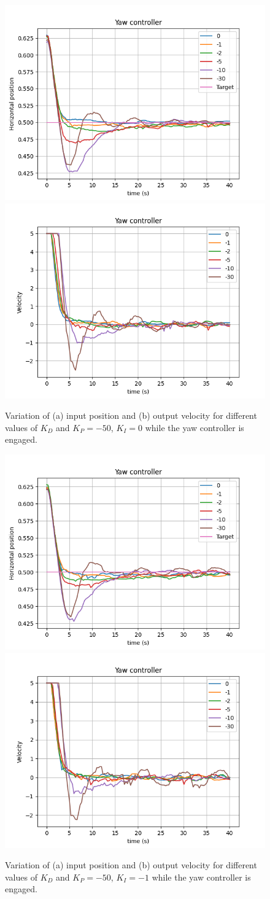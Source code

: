 \begin{figure}
  \centering
  \includegraphics[width=.45\linewidth]{img/pid/yaw/yaw_pos_p50_i0_der.png}
  \includegraphics[width=.45\linewidth]{img/pid/yaw/yaw_vel_p50_i0_der.png}
  \caption{Variation of (a) input position and (b) output velocity for different values of $K_{D}$ and $K_P=-50$, $K_I=0$ while the yaw controller is engaged.}\label{fig:tune-yaw-der-i0}
\end{figure}

\begin{figure}
  \centering
  \includegraphics[width=.45\linewidth]{img/pid/yaw/yaw_pos_p50_i1_der.png}
  \includegraphics[width=.45\linewidth]{img/pid/yaw/yaw_vel_p50_i1_der.png}
  \caption{Variation of (a) input position and (b) output velocity for different values of $K_{D}$ and $K_P=-50$, $K_I=-1$ while the yaw controller is engaged.}\label{fig:tune-yaw-der-i1}
\end{figure}



